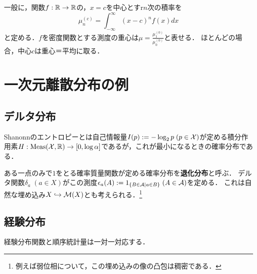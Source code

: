 \documentclass[uplatex,dvipdfmx]{jsreport}
\begin{document}
\begin{definition}[moment]
    一般に，関数$f:\mathbb{R}\to\mathbb{R}$の，$x=c$を中心とすr$n$次の積率を
    \[\mu_n^{(c)}=\int^\infty_{-\infty}(x-c)^nf(x)dx\]
    と定める．$f$を密度関数とする測度の重心は$\mu=\frac{\mu^{(0)}_1}{\mu^{(0)}_0}$と表せる．
    ほとんどの場合，中心$c$は重心＝平均に取る．
\end{definition}

\section{一次元離散分布の例}

\subsection{デルタ分布}

\begin{tcolorbox}[colframe=ForestGreen, colback=ForestGreen!10!white,breakable,colbacktitle=ForestGreen!40!white,coltitle=black,fonttitle=\bfseries\sffamily,
title=]
Shanonnのエントロピーとは自己情報量$I(p):=-\log_2p\;(p\in\mathcal{X})$が定める積分作用素$H:\mathrm{Meas}(\mathcal{X},\mathbb{R})\to[0,\log\alpha]$であるが，これが最小になるときの確率分布である．
\end{tcolorbox}

\begin{definition}
    ある一点のみで$1$をとる確率質量関数が定める確率分布を\textbf{退化分布}と呼ぶ．
    デルタ関数$\delta_a\;(a\in X)$がこの測度$\epsilon_a(A):=1_{\left\{B\in\mathcal{A}\mid a\in B\right\}}\;(A\in\mathcal{A})$を定める．
    これは自然な埋め込み$X\hookrightarrow\mathcal{M}(X)$とも考えられる．\footnote{例えば弱位相について，この埋め込みの像の凸包は稠密である．}
\end{definition}

\subsection{経験分布}

\begin{tcolorbox}[colframe=ForestGreen, colback=ForestGreen!10!white,breakable,colbacktitle=ForestGreen!40!white,coltitle=black,fonttitle=\bfseries\sffamily,
title=]
    経験分布関数と順序統計量は一対一対応する．
\end{tcolorbox}
\end{document}
